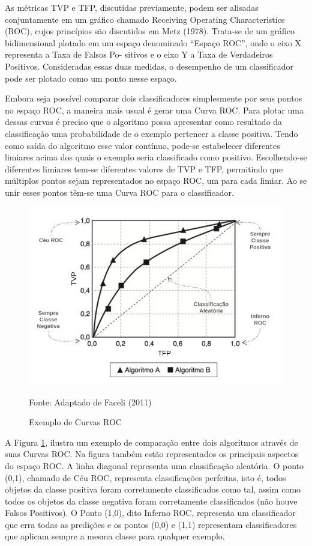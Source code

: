 \documentclass[openright]{UFRGS} %
\begin{document}
As métricas TVP e TFP, discutidas previamente, podem ser alisadas conjuntamente em um gráfico chamado Receiving Operating Characteristics (ROC), cujos princípios são discutidos em Metz (1978). Trata-se de um gráfico bidimensional plotado em
um espaço denominado “Espaço ROC”, onde o eixo X representa a Taxa de Falsos Po-
sitivos e o eixo Y a Taxa de Verdadeiros Positivos. Consideradas essas duas medidas, o
desempenho de um classificador pode ser plotado como um ponto nesse espaço.

Embora seja possível comparar dois classificadores simplesmente por seus pontos
no espaço ROC, a maneira mais usual é gerar uma Curva ROC. Para plotar uma dessas curvas é preciso que o algoritmo possa apresentar como resultado da classificação
uma probabilidade de o exemplo pertencer a classe positiva. Tendo como saída do algoritmo esse valor contínuo, pode-se estabelecer diferentes limiares acima dos quais o
exemplo seria classificado como positivo. Escolhendo-se diferentes limiares tem-se diferentes valores de TVP e TFP, permitindo que múltiplos pontos sejam representados no espaço ROC, um para cada limiar. Ao se unir esses pontos têm-se uma Curva ROC para
o classificador.

\begin{figure}[h]
    \centering
    \caption{Exemplo de Curvas ROC}
    \includegraphics[scale=0.40]{curvarocexemplo.png}
    \centerline{Fonte: Adaptado de Faceli (2011)}
    \label{fig:curvarocexempl}
\end{figure}


A Figura \ref{fig:curvarocexempl}, ilustra um exemplo de comparação entre dois algoritmos através de
suas Curvas ROC. Na figura também estão representados os principais aspectos do espaço
ROC. A linha diagonal representa uma classificação aleatória. O ponto (0,1), chamado
de Céu ROC, representa classificações perfeitas, isto é, todos objetos da classe positiva
foram corretamente classificados como tal, assim como todos os objetos da classe negativa
foram corretamente classificados (não houve Falsos Positivos). O Ponto (1,0), dito Inferno
ROC, representa um classificador que erra todas as predições e os pontos (0,0) e (1,1)
representam classificadores que aplicam sempre a mesma classe para qualquer exemplo.
\end{document}
